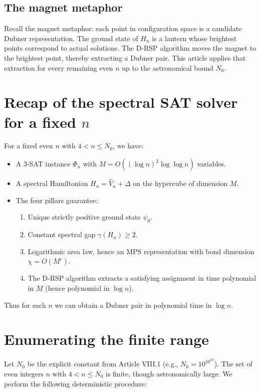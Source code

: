 \documentclass[11pt,a4paper]{article}
\begin{document}
\subsection{The magnet metaphor}

Recall the magnet metaphor: each point in configuration space is a candidate Dubner representation. The ground state of \(H_n\) is a lantern whose brightest points correspond to actual solutions. The D‑RSP algorithm moves the magnet to the brightest point, thereby extracting a Dubner pair. This article applies that extraction for every remaining even \(n\) up to the astronomical bound \(N_0\).

\section{Recap of the spectral SAT solver for a fixed \(n\)}

For a fixed even \(n\) with \(4 < n \le N_0\), we have:
\begin{itemize}
\item A 3‑SAT instance \(\Phi_n\) with \(M = O((\log n)^2 \log \log n)\) variables.
\item A spectral Hamiltonian \(H_n = \hat{V}_n + \Delta\) on the hypercube of dimension \(M\).
\item The four pillars guarantee:
  \begin{enumerate}
  \item Unique strictly positive ground state \(\psi_0\).
  \item Constant spectral gap \(\gamma(H_n) \ge 2\).
  \item Logarithmic area law, hence an MPS representation with bond dimension \(\chi = O(M^c)\).
  \item The D‑RSP algorithm extracts a satisfying assignment in time polynomial in \(M\) (hence polynomial in \(\log n\)).
  \end{enumerate}
\end{itemize}
Thus for each \(n\) we can obtain a Dubner pair in polynomial time in \(\log n\).

\section{Enumerating the finite range}

Let \(N_0\) be the explicit constant from Article VIII.1 (e.g., \(N_0 = 10^{10^{10}}\)). The set of even integers \(n\) with \(4 < n \le N_0\) is finite, though astronomically large. We perform the following deterministic procedure:
\end{document}
